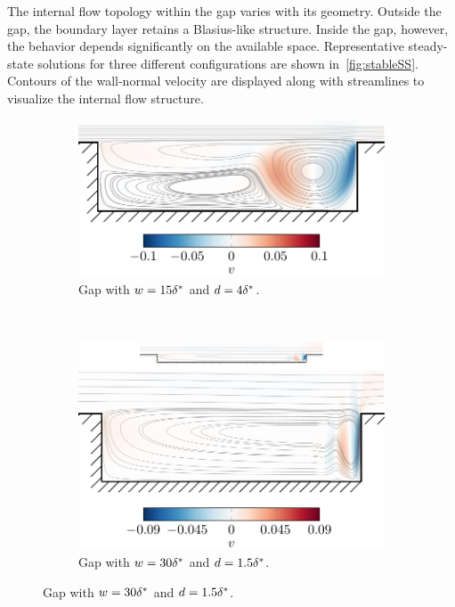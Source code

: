 \documentclass[../main.tex]{subfiles}
\begin{document}
The internal flow topology within the gap varies with its geometry. Outside the gap, the boundary layer retains a Blasius-like structure. Inside the gap, however, the behavior depends significantly on the available space. Representative steady-state solutions for three different configurations are shown in~\cref{fig:stableSS}. Contours of the wall-normal velocity are displayed along with streamlines to visualize the internal flow structure.

\begin{figure}[ht]
	\centering
	\begin{subfigure}[b]{0.49\textwidth}
		\centering
		\includegraphics[width=\textwidth]{../../Images/gapd4_w15.pdf}
		\caption{Gap with $w=15{\delta^*}$ and $d=4{\delta^*}$.}
		\label{fig:gapd4w15}
	\end{subfigure}\\[0.5cm]
	\begin{subfigure}[b]{0.49\textwidth}
		\centering
		\includegraphics[width=\textwidth]{../../Images/gapd1.5_w30.pdf}
		\caption{Gap with $w=30{\delta^*}$ and $d=1.5{\delta^*}$.}

\end{subfigure}
\end{figure}
\end{document}
